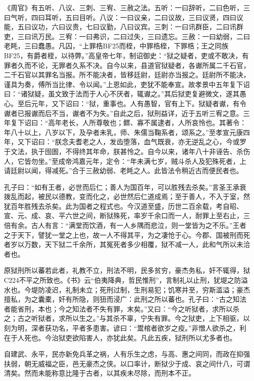 \documentclass[]{article}
\begin{document}
《周官》有五听、八议、三刺、三宥、三赦之法。五听：一曰辞听，二曰色听，三曰气听，四曰耳听，五曰目听。八议：一曰议亲，二曰议故，三曰议贤，四曰议能，五曰议功，六曰议贵，七曰议勤，八曰议宾。三刺：一曰讯群臣，二曰讯群吏，三曰讯万民。三宥：一曰弗识，二曰过失，三曰遗忘。三赦：一曰幼弱，二曰老眊，三曰蠢愚。凡囚，``上罪梏BF25而桎，中罪梏桎，下罪梏；王之同族BF25，有爵者桎，以待弊。''高皇帝七年，制诏御史：``狱之疑者，吏或不敢决，有罪者久而不论，无罪者久系不决。自今以来，县道官狱疑者，各谳所属二千石官，二千石官以其罪名当报。所不能决者，皆移廷尉，廷尉亦当报之。廷尉所不能决，谨具为奏，傅所当比律、令以闻。''上恩如此，吏犹不能奉宣。故孝景中五年复下诏曰：``诸狱疑，虽文致于法而于人心不厌者，辄谳之。''其后狱吏复避微文，遂其愚心。至后元年，又下诏曰：``狱，重事也。人有愚智，官有上下。狱疑者谳，有令谳者已报谳而后不当，谳者不为失。''自此之后，狱刑益详，近于五听三宥之意。三年复下诏曰：``高年老长，人所尊敬也；鳏、寡不属逮者，人所哀怜也。其著令：年八十以上，八岁以下，及孕者未乳，师、朱儒当鞠系者，颂系之。''至孝宣元康四年，又下诏曰：``朕念夫耆老之人，发齿堕落，血气既衰，亦无逆乱之心，今或罗于文法，执于囹圄，不得终其年命，朕甚怜之。自今以来，诸年八十非诬告、杀伤人，它皆勿坐。''至成帝鸿嘉元年，定令：``年未满七岁，贼斗杀人及犯殊死者，上请廷尉以闻，得减死。''合于三赦幼弱、老眊之人。此皆法令稍近古而便民者也。

孔子曰：``如有王者，必世而后仁；善人为国百年，可以胜残去杀矣。''言圣王承衰拨乱而起，被民以德教，变而化之，必世然后仁道成焉；至于善人，不入于室，然犹百年胜残去杀矣。此为国者之程式也。今汉道至盛，历世二百余载，考自昭、宣、元、成、哀、平六世之间，断狱殊死，率岁千余口而一人，耐罪上至右止，三倍有余。古人有言：``满堂而饮酒，有一人乡隅而悲泣，则一堂皆为之不乐。''王者之于天下，譬犹一堂之上也，故一人不得其平，为之凄怆于心。今郡、国被刑而死者岁以万数，天下狱二千余所，其冤死者多少相覆，狱不减一人，此和气所以未洽者也。

原狱刑所以蕃若此者，礼教不立，刑法不明，民多贫穷，豪杰务私，奸不辄得，狱C224不平之所致也。《书》云``伯夷降典，哲民惟刑''，言制礼以止刑，犹堤之防溢水也。今堤防凌迟，礼制未立；死刑过制，生刑易犯；饥寒并至，穷斯滥溢；豪杰擅私，为之囊橐，奸有所隐，则狃而浸广：此刑之所以蕃也。孔子曰：``古之知法者能省刑，本也；今之知法者不失有罪，末矣。''又曰：``今之听狱者，求所以杀之；古之听狱者，求所以生之。''与其杀不辜，宁失有罪。今之狱吏，上下相驱，以刻为明，深者获功名，平者多患害。谚曰：``鬻棺者欲岁之疫。''非憎人欲杀之，利在于人死也。今治狱吏欲陷害人，亦犹此矣。凡此五疾，狱刑所以尤多者也。

自建武、永平，民亦新免兵革之祸，人有乐生之虑，与高、惠之间同，而政在抑强扶弱，朝无威福之臣，邑无豪杰之侠。以口率计，断狱少于成、哀之间什八，可谓清矣。然而未能称意比隆于古者，以其疾未尽除，而刑本不正。
\end{document}
